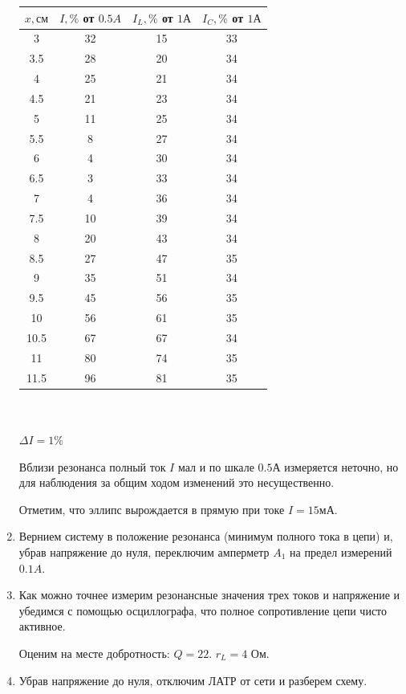 \documentclass[a4paper, 12pt]{article}
\begin{document}
\begin{enumerate}
    \begin{tabular}{|c|c|c|c|}
        \hline
        $x, см$ & $I, \%$ от $0.5 A$ & $I_L, \%$ от $1 А$ & $I_C, \%$ от $1 А$ \\ \hline
        3 & 32 & 15 & 33 \\ \hline
        3.5 & 28 & 20 & 34 \\ \hline
        4 & 25 & 21 & 34 \\ \hline
        4.5 & 21 & 23 & 34 \\ \hline
        5 & 11 & 25 & 34 \\ \hline
        5.5 & 8 & 27 & 34 \\ \hline
        6 & 4 & 30 & 34 \\ \hline
        6.5 & 3 & 33 & 34 \\ \hline
        7 & 4 & 36 & 34 \\ \hline
        7.5 & 10 & 39 & 34 \\ \hline
        8 & 20 & 43 & 34 \\ \hline
        8.5 & 27 & 47 & 35 \\ \hline
        9 & 35 & 51 & 34 \\ \hline
        9.5 & 45 & 56 & 35 \\ \hline
        10 & 56 & 61 & 35 \\ \hline
        10.5 & 67 & 67 & 34 \\ \hline
        11 & 80 & 74 & 35 \\ \hline
        11.5 & 96 & 81 & 35 \\ \hline
    \end{tabular}
    \\\\
    $\Delta I = 1 \%$

    Вблизи резонанса полный ток $I$ мал и по шкале $0.5 А$ измеряется неточно, но для наблюдения за общим ходом изменений это несущественно.

    Отметим, что эллипс вырождается в прямую при токе $I = 15 мА$.

    \item Вернием систему в положение резонанса (минимум полного тока в цепи) и, убрав напряжение до нуля, переключим амперметр $A_1$ на предел измерений $0.1 A$.
    
    \item Как можно точнее измерим резонансные значения трех токов и напряжение и убедимся с помощью осциллографа, что полное сопротивление цепи чисто активное.
    
    Оценим на месте добротность: $Q = 22$. $r_L = 4$ Ом.

    \item Убрав напряжение до нуля, отключим ЛАТР от сети и разберем схему.
\end{enumerate}
\end{document}

